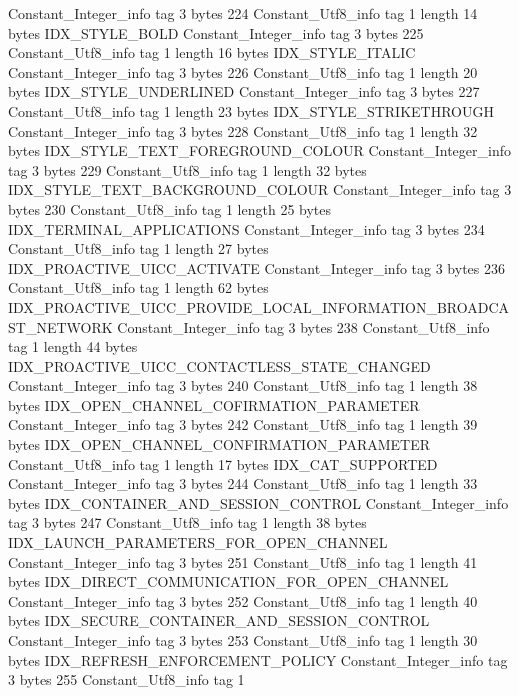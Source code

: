 {{{		}
		Constant_Integer_info {
			tag	3
			bytes	224
		}
		Constant_Utf8_info {
			tag	1
			length	14
			bytes	IDX_STYLE_BOLD
		}
		Constant_Integer_info {
			tag	3
			bytes	225
		}
		Constant_Utf8_info {
			tag	1
			length	16
			bytes	IDX_STYLE_ITALIC
		}
		Constant_Integer_info {
			tag	3
			bytes	226
		}
		Constant_Utf8_info {
			tag	1
			length	20
			bytes	IDX_STYLE_UNDERLINED
		}
		Constant_Integer_info {
			tag	3
			bytes	227
		}
		Constant_Utf8_info {
			tag	1
			length	23
			bytes	IDX_STYLE_STRIKETHROUGH
		}
		Constant_Integer_info {
			tag	3
			bytes	228
		}
		Constant_Utf8_info {
			tag	1
			length	32
			bytes	IDX_STYLE_TEXT_FOREGROUND_COLOUR
		}
		Constant_Integer_info {
			tag	3
			bytes	229
		}
		Constant_Utf8_info {
			tag	1
			length	32
			bytes	IDX_STYLE_TEXT_BACKGROUND_COLOUR
		}
		Constant_Integer_info {
			tag	3
			bytes	230
		}
		Constant_Utf8_info {
			tag	1
			length	25
			bytes	IDX_TERMINAL_APPLICATIONS
		}
		Constant_Integer_info {
			tag	3
			bytes	234
		}
		Constant_Utf8_info {
			tag	1
			length	27
			bytes	IDX_PROACTIVE_UICC_ACTIVATE
		}
		Constant_Integer_info {
			tag	3
			bytes	236
		}
		Constant_Utf8_info {
			tag	1
			length	62
			bytes	IDX_PROACTIVE_UICC_PROVIDE_LOCAL_INFORMATION_BROADCAST_NETWORK
		}
		Constant_Integer_info {
			tag	3
			bytes	238
		}
		Constant_Utf8_info {
			tag	1
			length	44
			bytes	IDX_PROACTIVE_UICC_CONTACTLESS_STATE_CHANGED
		}
		Constant_Integer_info {
			tag	3
			bytes	240
		}
		Constant_Utf8_info {
			tag	1
			length	38
			bytes	IDX_OPEN_CHANNEL_COFIRMATION_PARAMETER
		}
		Constant_Integer_info {
			tag	3
			bytes	242
		}
		Constant_Utf8_info {
			tag	1
			length	39
			bytes	IDX_OPEN_CHANNEL_CONFIRMATION_PARAMETER
		}
		Constant_Utf8_info {
			tag	1
			length	17
			bytes	IDX_CAT_SUPPORTED
		}
		Constant_Integer_info {
			tag	3
			bytes	244
		}
		Constant_Utf8_info {
			tag	1
			length	33
			bytes	IDX_CONTAINER_AND_SESSION_CONTROL
		}
		Constant_Integer_info {
			tag	3
			bytes	247
		}
		Constant_Utf8_info {
			tag	1
			length	38
			bytes	IDX_LAUNCH_PARAMETERS_FOR_OPEN_CHANNEL
		}
		Constant_Integer_info {
			tag	3
			bytes	251
		}
		Constant_Utf8_info {
			tag	1
			length	41
			bytes	IDX_DIRECT_COMMUNICATION_FOR_OPEN_CHANNEL
		}
		Constant_Integer_info {
			tag	3
			bytes	252
		}
		Constant_Utf8_info {
			tag	1
			length	40
			bytes	IDX_SECURE_CONTAINER_AND_SESSION_CONTROL
		}
		Constant_Integer_info {
			tag	3
			bytes	253
		}
		Constant_Utf8_info {
			tag	1
			length	30
			bytes	IDX_REFRESH_ENFORCEMENT_POLICY
		}
		Constant_Integer_info {
			tag	3
			bytes	255
		}
		Constant_Utf8_info {
			tag	1
}}}
